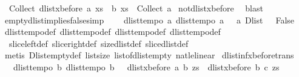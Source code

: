 \begin{isabellebody}
\ \ Collect\ {\isacharparenleft}dlist{\isacharunderscore}xbefore\ a\ {\isacharparenleft}{\isasymlambda}xs{\isachardot}\ {\isasymnot}\ b\ xs{\isacharparenright}{\isacharparenright}\ {\isacharequal}\ Collect\ a{\isachardoublequoteclose}\isanewline
%
\isadelimproof
%
\endisadelimproof
%
\isatagproof
{}\isamarkupfalse%
\ not{\isacharunderscore}{}{\isacharunderscore}dlist{\isacharunderscore}xbefore\ \isamarkupfalse%
\ blast%
\endisatagproof
{\isafoldproof}%
%
\isadelimproof
\isanewline
%
\endisadelimproof
\isanewline
{}\isamarkupfalse%
\ empty{\isacharunderscore}dlist{\isacharunderscore}implies{\isacharunderscore}false{\isacharbrackleft}simp{\isacharbrackright}{\isacharcolon}\ \isanewline
\ \ {\isachardoublequoteopen}{\isasymlbrakk}\ dlist{\isacharunderscore}tempo{}\ a{\isacharsemicolon}\ dlist{\isacharunderscore}tempo{}\ a\ {\isasymrbrakk}\ {\isasymLongrightarrow}\ a\ {\isacharparenleft}Dlist\ {\isacharbrackleft}{\isacharbrackright}{\isacharparenright}\ {\isasymLongrightarrow}\ False{\isachardoublequoteclose}\isanewline
%
\isadelimproof
%
\endisadelimproof
%
\isatagproof
{}\isamarkupfalse%
\ dlist{\isacharunderscore}tempo{}{\isacharunderscore}def\ dlist{\isacharunderscore}tempo{}{\isacharunderscore}def\ dlist{\isacharunderscore}tempo{}{\isacharunderscore}def\ dlist{\isacharunderscore}tempo{}{\isacharunderscore}def\isanewline
\ \ slice{\isacharunderscore}left{\isacharunderscore}def\ slice{\isacharunderscore}right{\isacharunderscore}def\ size{\isacharunderscore}dlist{\isacharunderscore}def\ slice{\isacharunderscore}dlist{\isacharunderscore}def\isanewline
{}\isamarkupfalse%
\ {\isacharparenleft}metis\ Dlist{\isachardot}empty{\isacharunderscore}def\ list{\isachardot}size{\isacharparenleft}{}{\isacharparenright}\ list{\isacharunderscore}of{\isacharunderscore}dlist{\isacharunderscore}empty\ nat{\isacharunderscore}le{\isacharunderscore}linear{\isacharparenright}%
\endisatagproof
{\isafoldproof}%
%
\isadelimproof
\isanewline
%
\endisadelimproof
\isanewline
\isanewline
{}\isamarkupfalse%
\ dlist{\isacharunderscore}inf{\isacharunderscore}xbefore{\isacharunderscore}trans{\isacharcolon}\isanewline
\ \ {\isachardoublequoteopen}{\isasymlbrakk}\ dlist{\isacharunderscore}tempo{}\ b{\isacharsemicolon}\ dlist{\isacharunderscore}tempo{}\ b\ {\isasymrbrakk}\ {\isasymLongrightarrow}\ {\isacharparenleft}{\isacharparenleft}dlist{\isacharunderscore}xbefore\ a\ b\ zs{\isacharparenright}\ {\isasymand}\ {\isacharparenleft}dlist{\isacharunderscore}xbefore\ b\ c\ zs{\isacharparenright}{\isacharparenright}\ {\isasymlongleftrightarrow}\ \isanewline

\end{isabellebody}
